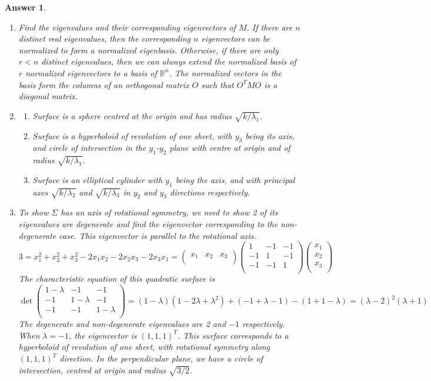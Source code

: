 \documentclass[a4paper]{article}
\newtheorem{ans}{Answer}[section]
\theoremstyle{new}
\begin{document}
\begin{ans}\leavevmode
\begin{enumerate}[label=(\roman*)]
\item Find the eigenvalues and their corresponding eigenvectors of $M$. If there are $n$ distinct real eigenvalues, then the corresponding $n$ eigenvectors can be normalized to form a normalized eigenbasis. Otherwise, if there are only $r<n$ distinct eigenvalues, then we can always extend the normalized basis of $r$ normalized eigenvectors to a basis of $\mathbb{R}^n$. The normalized vectors in the basis form the columns of an orthogonal matrix $O$ such that $O^TMO$ is a diagonal matrix.
\item
\begin{enumerate}[label=(\alph*)]
\item Surface is a sphere centred at the origin and has radius $\sqrt{k/\lambda_1}$.
\item Surface is a hyperboloid of revolution of one sheet, with $y_3$ being its axis, and circle of intersection in the $y_1$-$y_2$ plane with centre at origin and of radius $\sqrt{k/\lambda_1}$.
\item Surface is an elliptical cylinder with $y_1$ being the axis, and with principal axes $\sqrt{k/\lambda_2}$ and $\sqrt{k/\lambda_3}$ in $y_2$ and $y_3$ directions respectively.
\end{enumerate}
\item To show $\Sigma$ has an axis of rotational symmetry, we need to show 2 of its eigenvalues are degenerate and find the eigenvector corresponding to the non-degenerate case. This eigenvector is parallel to the rotational axis.
$$3=x_1^2+x_2^2+x_3^2-2x_1x_2-2x_2x_3-2x_3x_1=\begin{pmatrix}x_1&x_2&x_3\\\end{pmatrix}\begin{pmatrix}1&-1&-1\\-1&1&-1\\-1&-1&1\\\end{pmatrix}\begin{pmatrix}x_1\\x_2\\x_3\\\end{pmatrix}$$
The characteristic equation of this quadratic surface is
$$\det\begin{pmatrix}1-\lambda&-1&-1\\-1&1-\lambda&-1\\-1&-1&1-\lambda\\\end{pmatrix}=(1-\lambda)(1-2\lambda+\lambda^2)+(-1+\lambda-1)-(1+1-\lambda)=(\lambda-2)^2(\lambda+1)$$
The degenerate and non-degenerate eigenvalues are 2 and $-1$ respectively. When $\lambda=-1$, the eigenvector is $(1,1,1)^T$. This surface corresponds to a hyperboloid of revolution of one sheet, with rotational symmetry along $(1,1,1)^T$ direction. In the perpendicular plane, we have a circle of intersection, centred at origin and radius $\sqrt{3/2}$.
\end{enumerate}
\end{ans}
\end{document}
